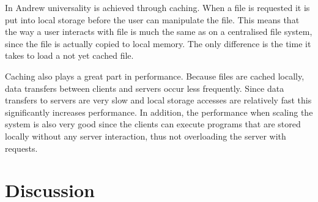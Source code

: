 \documentclass[a4paper,12px]{article}
\begin{document}
In Andrew universality is achieved through caching. When a file is requested it
is put into local storage before the user can manipulate the file. This means
that the way a user interacts with file is much the same as on a centralised
file system, since the file is actually copied to local memory. The only
difference is the time it takes to load a not yet cached file.\cite{concepts}

Caching also plays a great part in performance. Because files are cached
locally, data transfers between clients and servers occur less frequently. Since
data transfers to servers are very slow and local storage accesses are
relatively fast this significantly increases performance. In addition, the
performance when scaling the system is also very good since the clients can
execute programs that are stored locally without any server interaction, thus
not overloading the server with requests.\cite{andrew}






\section{Discussion}




\clearpage


\end{document}
